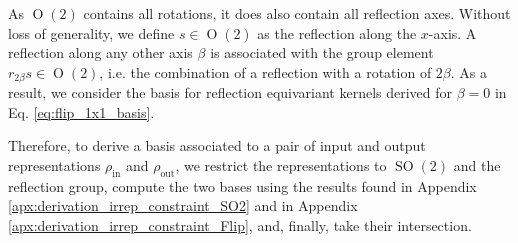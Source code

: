 \documentclass{article}
\newcommand{\apx}{Appendix\xspace
}
\renewcommand{\O}[1]{\ensuremath{\operatorname{O}(#1)}}
\newcommand{\SO}[1]{\ensuremath{\operatorname{SO}(#1)}}
\begin{document}
As $\O2$ contains all rotations, it does also contain all reflection axes. 
Without loss of generality, we define $s \in \O2$ as the reflection along the $x$-axis. 
A reflection along any other axis $\beta$ is associated with the group element $r_{2\beta}s \in \O2$, i.e. the combination of a reflection with a rotation of $2\beta$.
As a result, we consider the basis for reflection equivariant kernels derived for $\beta = 0$ in Eq. \eqref{eq:flip_1x1_basis}.

Therefore, to derive a basis associated to a pair of input and output representations $\rho_\text{in}$ and $\rho_\text{out}$, we restrict the representations to $\SO2$ and the reflection group, compute the two bases using the results found in \apx \ref{apx:derivation_irrep_constraint_SO2} and in \apx \ref{apx:derivation_irrep_constraint_Flip}, and, finally, take their intersection.

~\\[-4.ex]
\end{document}
